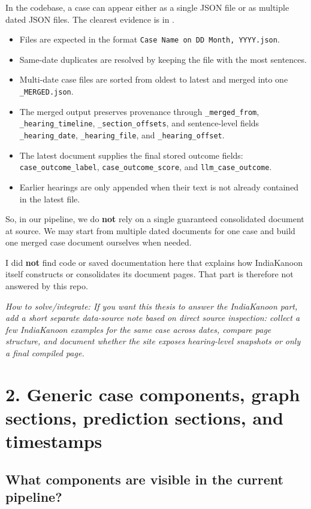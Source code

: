 \documentclass[12pt,a4paper]{article}
\newcommand{\futurework}[1]{\textcolor{futureblue}{\textit{How to solve/integrate: #1}}}
\begin{document}
In the codebase, a case can appear either as a single JSON file or as multiple dated JSON files. The clearest evidence is in .

\begin{itemize}[noitemsep]
\item Files are expected in the format \texttt{Case Name on DD Month, YYYY.json}.
\item Same-date duplicates are resolved by keeping the file with the most sentences.
\item Multi-date case files are sorted from oldest to latest and merged into one \texttt{\_MERGED.json}.
\item The merged output preserves provenance through \texttt{\_merged\_from}, \texttt{\_hearing\_timeline}, \texttt{\_section\_offsets}, and sentence-level fields \texttt{\_hearing\_date}, \texttt{\_hearing\_file}, and \texttt{\_hearing\_offset}.
\item The latest document supplies the final stored outcome fields: \texttt{case\_outcome\_label}, \texttt{case\_outcome\_score}, and \texttt{llm\_case\_outcome}.
\item Earlier hearings are only appended when their text is not already contained in the latest file.
\end{itemize}

So, in our pipeline, we do \textbf{not} rely on a single guaranteed consolidated document at source. We may start from multiple dated documents for one case and build one merged case document ourselves when needed.

I did \textbf{not} find code or saved documentation here that explains how IndiaKanoon itself constructs or consolidates its document pages. That part is therefore not answered by this repo.

\futurework{If you want this thesis to answer the IndiaKanoon part, add a short separate data-source note based on direct source inspection: collect a few IndiaKanoon examples for the same case across dates, compare page structure, and document whether the site exposes hearing-level snapshots or only a final compiled page.}

\section*{2. Generic case components, graph sections, prediction sections, and timestamps}

\subsection*{What components are visible in the current pipeline?}
\end{document}
